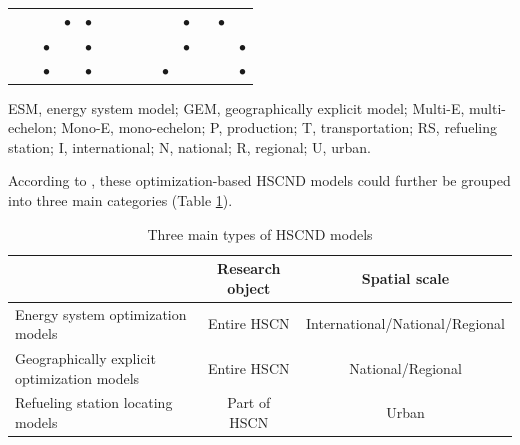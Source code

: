\documentclass[11pt,3p]{elsarticle}
\begin{document}
\begin{table}[!htbp]
{\begin{tabular}{lccccccccccccc}
\citet{woo2016optimization} &  &  & $\bullet$ & $\bullet$ &  &  &  &  &  & $\bullet$ &  & $\bullet$ &  \\
\citet{yang2013renewable} &  & $\bullet$ &  & $\bullet$ &  &  &  &  &  & $\bullet$ &  &  & $\bullet$ \\
\citet{yeh2008optimizing} &  & $\bullet$ &  & $\bullet$ &  &  &  &  & $\bullet$ &  &  &  & $\bullet$ \\ \hline
\end{tabular}%
}
\begin{tablenotes}
\small
\item ESM, energy system model; GEM, geographically explicit model; Multi-E, multi-echelon; Mono-E, mono-echelon; P, production; T, transportation; RS, refueling station; I, international; N, national; R, regional; U, urban.
\end{tablenotes}
\end{table}

According to \citet{agnolucci2013designing}, these optimization-based HSCND models could further be grouped into three main categories (Table \ref{tab:ThreeTypesModels}). 

\begin{table}[!htbp]
\centering
\caption{Three main types of HSCND models}
\label{tab:ThreeTypesModels}
\begin{tabular}{lcc}
\hline
 & Research object & Spatial scale \\ \hline
Energy system optimization models & Entire HSCN & International/National/Regional \\
Geographically explicit optimization models & Entire HSCN & National/Regional \\
Refueling station locating models & Part of HSCN & Urban \\ \hline
\end{tabular}
\end{table}
\end{document}
